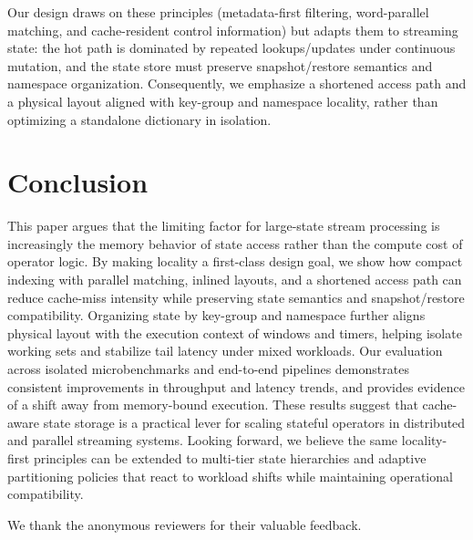 \documentclass[sigconf]{acmart}
\begin{document}
Our design draws on these principles (metadata-first filtering, word-parallel matching, and cache-resident control information) but adapts them to streaming state: the hot path is dominated by repeated lookups/updates under continuous mutation, and the state store must preserve snapshot/restore semantics and namespace organization. Consequently, we emphasize a shortened access path and a physical layout aligned with key-group and namespace locality, rather than optimizing a standalone dictionary in isolation.

\section{Conclusion}
This paper argues that the limiting factor for large-state stream processing is increasingly the memory behavior of state access rather than the compute cost of operator logic. By making locality a first-class design goal, we show how compact indexing with parallel matching, inlined layouts, and a shortened access path can reduce cache-miss intensity while preserving state semantics and snapshot/restore compatibility. Organizing state by key-group and namespace further aligns physical layout with the execution context of windows and timers, helping isolate working sets and stabilize tail latency under mixed workloads. Our evaluation across isolated microbenchmarks and end-to-end pipelines demonstrates consistent improvements in throughput and latency trends, and provides evidence of a shift away from memory-bound execution. These results suggest that cache-aware state storage is a practical lever for scaling stateful operators in distributed and parallel streaming systems. Looking forward, we believe the same locality-first principles can be extended to multi-tier state hierarchies and adaptive partitioning policies that react to workload shifts while maintaining operational compatibility.

\begin{acks}
We thank the anonymous reviewers for their valuable feedback.
\end{acks}


\end{document}
